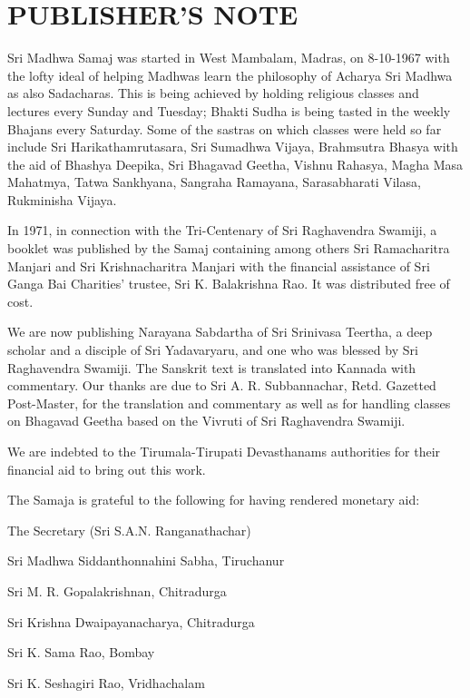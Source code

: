
\chapter*{PUBLISHER'S NOTE}

Sri Madhwa Samaj was started in West Mambalam, Madras, on 8-10-1967 with the lofty ideal of helping Madhwas learn the philosophy of Acharya Sri Madhwa as also Sadacharas. This is being achieved by holding religious classes and lectures every Sunday and Tuesday; Bhakti Sudha is being tasted in the weekly Bhajans every Saturday. Some of the sastras on which classes were held so far include Sri Harikathamrutasara, Sri Sumadhwa Vijaya, Brahmsutra Bhasya with the aid of Bhashya Deepika, Sri Bhagavad Geetha, Vishnu Rahasya, Magha Masa Mahatmya, Tatwa Sankhyana, Sangraha Ramayana, Sarasabharati Vilasa, Rukminisha Vijaya.

In 1971, in connection with the Tri-Centenary of Sri Raghavendra Swamiji, a booklet was published by the Samaj containing among others Sri Ramacharitra Manjari and Sri Krishnacharitra Manjari with the financial assistance of Sri Ganga Bai Charities' trustee, Sri K. Balakrishna Rao. It was distributed free of cost.

We are now publishing Narayana Sabdartha of Sri Srinivasa Teertha, a deep scholar and a disciple of Sri Yadavaryaru, and one who was blessed by Sri Raghavendra Swamiji. The Sanskrit text is translated into Kannada with commentary. Our thanks are due to Sri A. R. Subbannachar, Retd. Gazetted Post-Master, for the translation and commentary as well as for handling classes on Bhagavad Geetha based on the Vivruti of Sri Raghavendra Swamiji.

We are indebted to the Tirumala-Tirupati Devasthanams authorities for their financial aid to bring out this work.

The Samaja is grateful to the following for having rendered monetary aid:

\item 
 The Secretary (Sri S.A.N. Ranganathachar)

 Sri Madhwa Siddanthonnahini Sabha, Tiruchanur

 \item Sri M. R. Gopalakrishnan, Chitradurga

 \item Sri Krishna Dwaipayanacharya, Chitradurga

 \item Sri K. Sama Rao, Bombay

 \item Sri K. Seshagiri Rao, Vridhachalam

